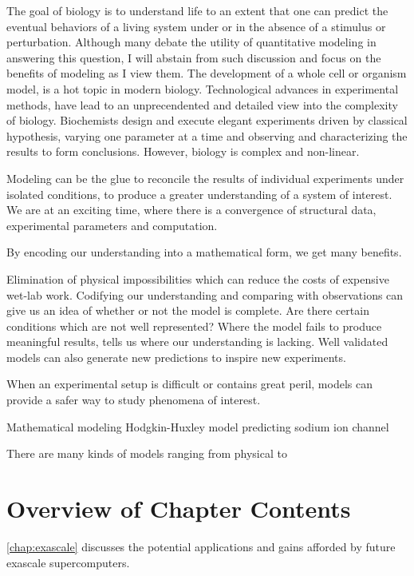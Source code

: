 
\par The goal of biology is to understand life to an extent that one can predict the eventual behaviors of a living system under or in the absence of a stimulus or perturbation.
Although many debate the utility of quantitative modeling in answering this question, I will abstain from such discussion and focus on the benefits of modeling as I view them.
The development of a whole cell or organism model, is a hot topic in modern biology.
Technological advances in experimental methods, have lead to an unprecendented and detailed view into the complexity of biology.
Biochemists design and execute elegant experiments driven by classical hypothesis, varying one parameter at a time and observing and characterizing the results to form conclusions.
However, biology is complex and non-linear.

\par Modeling can be the glue to reconcile the results of individual experiments under isolated conditions, to produce a greater understanding of a system of interest.
We are at an exciting time, where there is a convergence of structural data, experimental parameters and computation.

\cite{Karr2012}

By encoding our understanding into a mathematical form, we get many benefits.
\cite{Gunawardena2014}

Elimination of physical impossibilities which can reduce the costs of expensive wet-lab work.
Codifying our understanding and comparing with observations can give us an idea of whether or not the model is complete.
Are there certain conditions which are not well represented?
Where the model fails to produce meaningful results, tells us where our understanding is lacking.
Well validated models can also generate new predictions to inspire new experiments.

\par When an experimental setup is difficult or contains great peril, models can provide a safer way to study phenomena of interest.


\par Mathematical modeling Hodgkin-Huxley model predicting sodium ion channel\cite{Sigg2014a}


There are many kinds of models ranging from physical to

\par

\section{Overview of Chapter Contents}

\par \cref{chap:exascale} discusses the potential applications and gains afforded by future exascale supercomputers.

